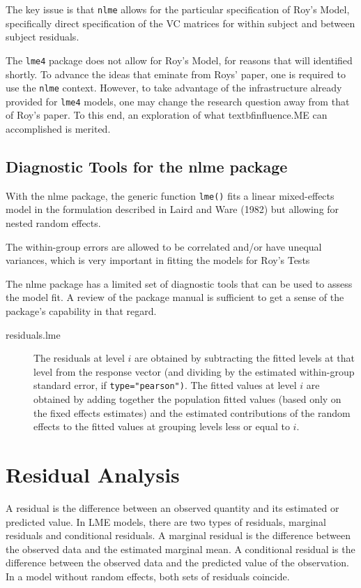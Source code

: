 \documentclass[Main.tex]{subfiles}
\begin{document}
The key issue is that \texttt{nlme} allows for the particular specification of Roy's Model, specifically direct specification of the VC matrices for within subject and between subject residuals.

The \texttt{lme4} package does not allow for Roy's Model, for reasons that will identified shortly.
To advance the ideas that eminate from Roys' paper, one is required to use the \texttt{nlme} context. However, to take advantage of the infrastructure already provided for \texttt{lme4} models, one may change the research question away from that of Roy's paper. 
To this end, an exploration of what textbf{influence.ME} can accomplished is merited.





\newpage
\section{Diagnostic Tools for the nlme package}


With the nlme package, the generic function \texttt{lme()} fits a linear mixed-effects model in the formulation described in Laird and Ware (1982) but allowing for nested random effects. 

The within-group errors are allowed to be correlated and/or have unequal variances, which is very important in fitting the models for Roy's Tests

The nlme package has a limited set of diagnostic tools that can be used to assess the model fit. A review of the package manual is sufficient to get a sense of the package's capability in that regard.

\begin{description}
	\item[residuals.lme] 
	The residuals at level $i$ are obtained by subtracting the fitted levels at that level from the response
	vector (and dividing by the estimated within-group standard error, if \texttt{type="pearson")}. The fitted
	values at level $i$ are obtained by adding together the population fitted values (based only on the
	fixed effects estimates) and the estimated contributions of the random effects to the fitted values at
	grouping levels less or equal to $i$.
\end{description}


\chapter{Residual Analysis}
A residual is the difference between an observed quantity and its estimated or predicted value. In LME models, there are two types of residuals, marginal residuals and conditional residuals. A marginal residual is the difference between the observed data and the estimated marginal mean. A conditional residual is the difference between the observed data and the predicted value of the observation. In a model without random effects, both sets of residuals coincide.
\end{document}

